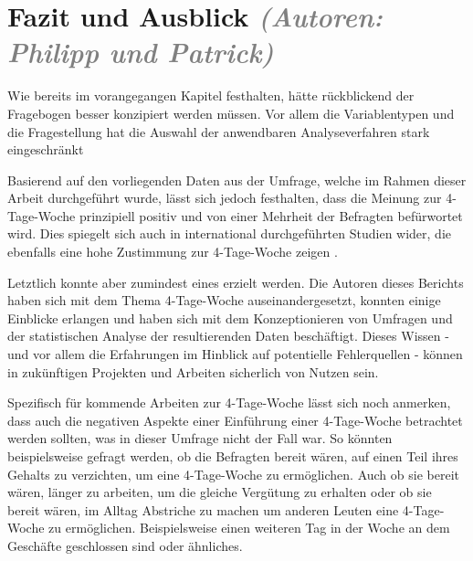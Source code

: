 \chapter{Fazit und Ausblick \textit{\textcolor{gray}{(Autoren: Philipp und Patrick)}}}

Wie bereits im vorangegangen Kapitel festhalten, hätte rückblickend der Fragebogen besser konzipiert werden müssen.
Vor allem die Variablentypen und die Fragestellung hat die Auswahl der anwendbaren Analyseverfahren stark eingeschränkt

Basierend auf den vorliegenden Daten aus der Umfrage, welche im Rahmen dieser Arbeit durchgeführt wurde, 
lässt sich jedoch festhalten, dass die Meinung zur 4-Tage-Woche prinzipiell positiv und von einer Mehrheit
der Befragten befürwortet wird. Dies spiegelt sich auch in international durchgeführten Studien wider,
die ebenfalls eine hohe Zustimmung zur 4-Tage-Woche zeigen \parencite[vgl.][]{4_day_week_limited_4_2023}.



Letztlich konnte aber zumindest eines erzielt werden. Die Autoren dieses Berichts haben sich mit dem Thema 4-Tage-Woche
auseinandergesetzt, konnten einige Einblicke erlangen und haben sich mit dem Konzeptionieren von Umfragen und der 
statistischen Analyse der resultierenden Daten beschäftigt. Dieses Wissen - und vor allem die Erfahrungen im Hinblick auf
potentielle Fehlerquellen - können in zukünftigen Projekten und Arbeiten sicherlich von Nutzen sein.

Spezifisch für kommende Arbeiten zur 4-Tage-Woche lässt sich noch anmerken, dass auch die negativen Aspekte einer
Einführung einer 4-Tage-Woche betrachtet werden sollten, was in dieser Umfrage nicht der Fall war. 
So könnten beispielsweise gefragt werden, ob die Befragten bereit wären, auf einen Teil ihres Gehalts 
zu verzichten, um eine 4-Tage-Woche zu ermöglichen. Auch ob sie bereit wären, länger zu arbeiten, um die gleiche
Vergütung zu erhalten oder ob sie bereit wären, im Alltag Abstriche zu machen um anderen Leuten eine 4-Tage-Woche 
zu ermöglichen. Beispielsweise einen weiteren Tag in der Woche an dem Geschäfte geschlossen sind oder ähnliches.